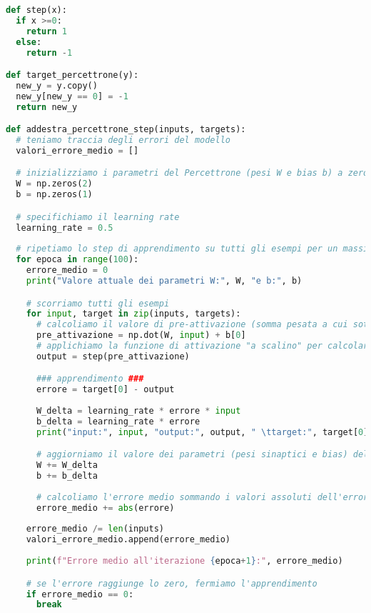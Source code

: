 \begin{lstlisting}[language=Python, caption=Funzioni di Addestramento]
def step(x):
  if x >=0:
    return 1
  else:
    return -1

def target_percettrone(y):
  new_y = y.copy()
  new_y[new_y == 0] = -1
  return new_y

def addestra_percettrone_step(inputs, targets):
  # teniamo traccia degli errori del modello
  valori_errore_medio = []  

  # inizializziamo i parametri del Percettrone (pesi W e bias b) a zero
  W = np.zeros(2)  
  b = np.zeros(1)

  # specifichiamo il learning rate
  learning_rate = 0.5
  
  # ripetiamo lo step di apprendimento su tutti gli esempi per un massimo di 100 volte
  for epoca in range(100):  
    errore_medio = 0
    print("Valore attuale dei parametri W:", W, "e b:", b)

    # scorriamo tutti gli esempi
    for input, target in zip(inputs, targets): 
      # calcoliamo il valore di pre-attivazione (somma pesata a cui sottraggo il bias) 
      pre_attivazione = np.dot(W, input) + b[0]  
      # applichiamo la funzione di attivazione "a scalino" per calcolare l'output
      output = step(pre_attivazione)  

      ### apprendimento ###
      errore = target[0] - output
      
      W_delta = learning_rate * errore * input
      b_delta = learning_rate * errore
      print("input:", input, "output:", output, " \ttarget:", target[0], " \terrore:", errore, " \tW_delta:", W_delta, " \tb_delta:", b_delta)

      # aggiorniamo il valore dei parametri (pesi sinaptici e bias) del Percettrone
      W += W_delta  
      b += b_delta
      
      # calcoliamo l'errore medio sommando i valori assoluti dell'errore
      errore_medio += abs(errore) 
      
    errore_medio /= len(inputs)
    valori_errore_medio.append(errore_medio)
    
    print(f"Errore medio all'iterazione {epoca+1}:", errore_medio)

    # se l'errore raggiunge lo zero, fermiamo l'apprendimento
    if errore_medio == 0: 
      break
\end{lstlisting}

